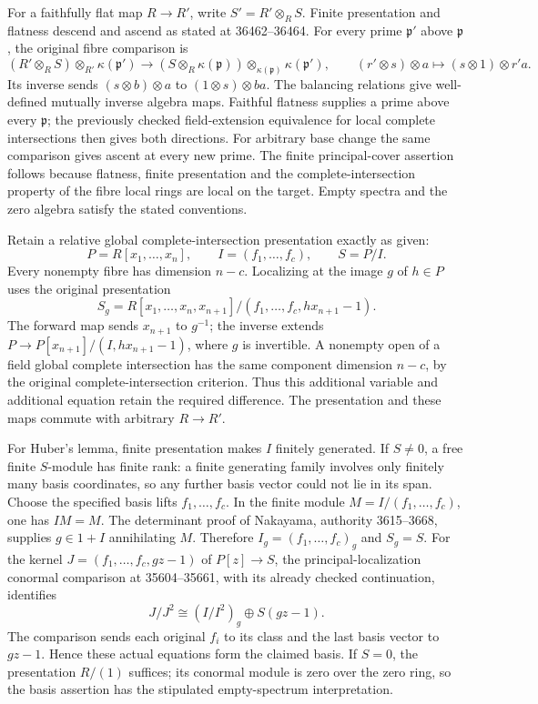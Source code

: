For a faithfully flat map \(R\to R'\), write \(S'=R'\otimes_R S\). Finite presentation and flatness descend and ascend as stated at 36462--36464. For every prime \(\mathfrak p'\) above \(\mathfrak p\), the original fibre comparison is \[
(R'\otimes_R S)\otimes_{R'}\kappa(\mathfrak p')
\longrightarrow
(S\otimes_R\kappa(\mathfrak p))\otimes_{\kappa(\mathfrak p)}\kappa(\mathfrak p'),
\qquad (r'\otimes s)\otimes a\longmapsto(s\otimes1)\otimes r'a.
\] Its inverse sends \((s\otimes b)\otimes a\) to \((1\otimes s)\otimes ba\). The balancing relations give well-defined mutually inverse algebra maps. Faithful flatness supplies a prime above every \(\mathfrak p\); the previously checked field-extension equivalence for local complete intersections then gives both directions. For arbitrary base change the same comparison gives ascent at every new prime. The finite principal-cover assertion follows because flatness, finite presentation and the complete-intersection property of the fibre local rings are local on the target. Empty spectra and the zero algebra satisfy the stated conventions.

Retain a relative global complete-intersection presentation exactly as given: \[
P=R[x_1,\ldots,x_n],\qquad I=(f_1,\ldots,f_c),\qquad S=P/I.
\] Every nonempty fibre has dimension \(n-c\). Localizing at the image \(g\) of \(h\in P\) uses the original presentation \[
S_g=R[x_1,\ldots,x_n,x_{n+1}]/(f_1,\ldots,f_c,hx_{n+1}-1).
\] The forward map sends \(x_{n+1}\) to \(g^{-1}\); the inverse extends \(P\to P[x_{n+1}]/(I,hx_{n+1}-1)\), where \(g\) is invertible. A nonempty open of a field global complete intersection has the same component dimension \(n-c\), by the original complete-intersection criterion. Thus this additional variable and additional equation retain the required difference. The presentation and these maps commute with arbitrary \(R\to R'\).

For Huber's lemma, finite presentation makes \(I\) finitely generated. If \(S\ne0\), a free finite \(S\)-module has finite rank: a finite generating family involves only finitely many basis coordinates, so any further basis vector could not lie in its span. Choose the specified basis lifts \(f_1,\ldots,f_c\). In the finite module \(M=I/(f_1,\ldots,f_c)\), one has \(IM=M\). The determinant proof of Nakayama, authority 3615--3668, supplies \(g\in1+I\) annihilating \(M\). Therefore \(I_g=(f_1,\ldots,f_c)_g\) and \(S_g=S\). For the kernel \(J=(f_1,\ldots,f_c,gz-1)\) of \(P[z]\to S\), the principal-localization conormal comparison at 35604--35661, with its already checked continuation, identifies \[
J/J^2\cong (I/I^2)_g\oplus S(gz-1).
\] The comparison sends each original \(f_i\) to its class and the last basis vector to \(gz-1\). Hence these actual equations form the claimed basis. If \(S=0\), the presentation \(R/(1)\) suffices; its conormal module is zero over the zero ring, so the basis assertion has the stipulated empty-spectrum interpretation.

